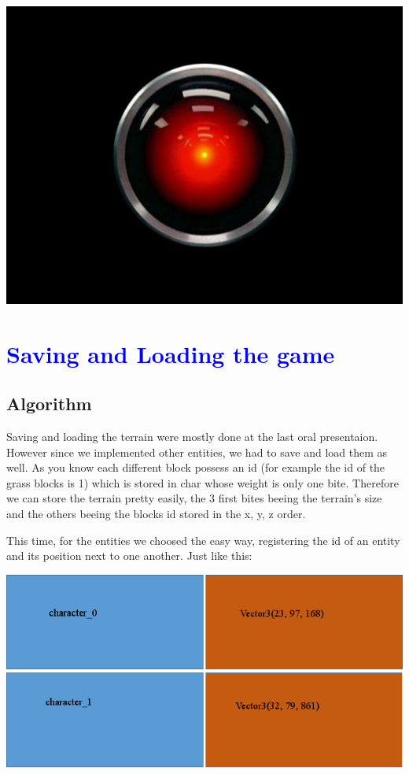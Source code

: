 \documentclass[article]{report}             %
\begin{document}
				\begin{center}
					\includegraphics[width=15cm, height = 10cm]{images/hal.jpg}
				\end{center}

		\chapter{\textcolor{blue}{Saving and Loading the game}}
			\section{Algorithm}
				Saving and loading the terrain were mostly done at the last oral presentaion. However since we implemented other entities, we had to save and load them as well.
				As you know each different block possess an id (for example the id of the grass blocks is  1) which is stored in char whose weight is only one bite. Therefore we can store the terrain pretty easily, the 3 first bites beeing the terrain's size and the others beeing the blocks id stored in the x, y, z order.

				This time, for the entities we choosed the easy way, registering the id of an entity and its position next to one another. Just like this:\\						
							\begin{center}
								\includegraphics[width = 15cm]{images/Save.png}
							\end{center}
				
\end{document}
